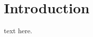 \documentclass[12pt]{article}
\begin{document}
\maketitle

\section{Introduction}
text here.



\end{document}
